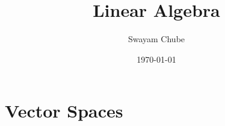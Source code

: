 \documentclass[12pt]{report}
\title{Linear Algebra}
\author{Swayam Chube}
\date{\today}
\begin{document}
    \maketitle
    \tableofcontents

    \chapter{Vector Spaces}
    
\end{document}
